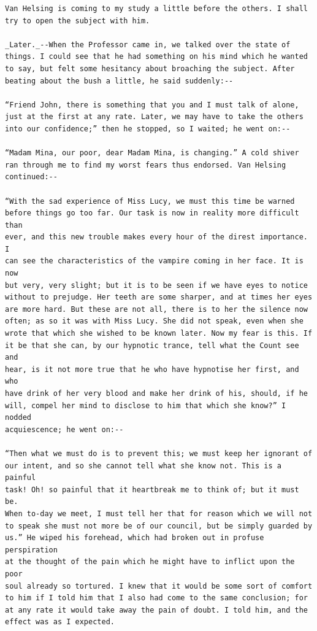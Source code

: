 \documentclass{article}
\begin{document}
\begin{verbatim}
Van Helsing is coming to my study a little before the others. I shall
try to open the subject with him.

_Later._--When the Professor came in, we talked over the state of
things. I could see that he had something on his mind which he wanted
to say, but felt some hesitancy about broaching the subject. After
beating about the bush a little, he said suddenly:--

“Friend John, there is something that you and I must talk of alone,
just at the first at any rate. Later, we may have to take the others
into our confidence;” then he stopped, so I waited; he went on:--

“Madam Mina, our poor, dear Madam Mina, is changing.” A cold shiver
ran through me to find my worst fears thus endorsed. Van Helsing
continued:--

“With the sad experience of Miss Lucy, we must this time be warned
before things go too far. Our task is now in reality more difficult than
ever, and this new trouble makes every hour of the direst importance. I
can see the characteristics of the vampire coming in her face. It is now
but very, very slight; but it is to be seen if we have eyes to notice
without to prejudge. Her teeth are some sharper, and at times her eyes
are more hard. But these are not all, there is to her the silence now
often; as so it was with Miss Lucy. She did not speak, even when she
wrote that which she wished to be known later. Now my fear is this. If
it be that she can, by our hypnotic trance, tell what the Count see and
hear, is it not more true that he who have hypnotise her first, and who
have drink of her very blood and make her drink of his, should, if he
will, compel her mind to disclose to him that which she know?” I nodded
acquiescence; he went on:--

“Then what we must do is to prevent this; we must keep her ignorant of
our intent, and so she cannot tell what she know not. This is a painful
task! Oh! so painful that it heartbreak me to think of; but it must be.
When to-day we meet, I must tell her that for reason which we will not
to speak she must not more be of our council, but be simply guarded by
us.” He wiped his forehead, which had broken out in profuse perspiration
at the thought of the pain which he might have to inflict upon the poor
soul already so tortured. I knew that it would be some sort of comfort
to him if I told him that I also had come to the same conclusion; for
at any rate it would take away the pain of doubt. I told him, and the
effect was as I expected.


\end{verbatim}
\end{document}
